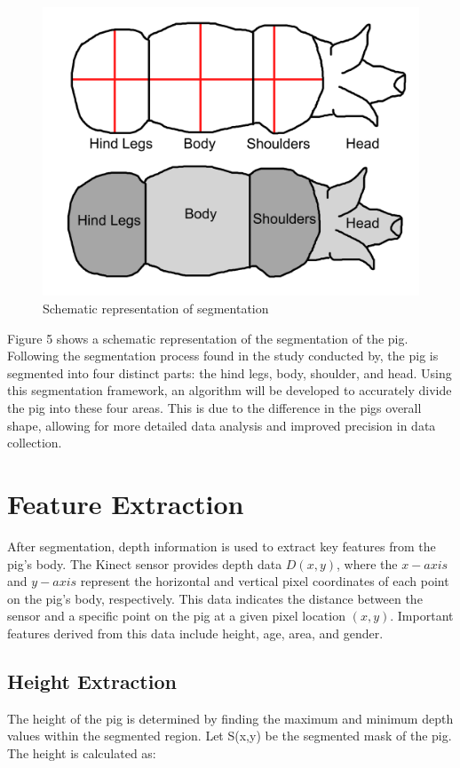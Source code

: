 {\begin{figure}[h]
	\centering
	\includegraphics[height=0.4\textheight]{figures/Untitled-1 (1)}
	\caption{Schematic representation of segmentation}
	\label{fig: Schematic representation of segmentation}
\end{figure}

Figure 5 shows a schematic representation of the segmentation of the pig. Following the segmentation process found in the study conducted by, the pig is segmented into four distinct parts: the hind legs, body, shoulder, and head. Using this segmentation framework, an algorithm will be developed to accurately divide the pig into these four areas. This is due to the difference in the pigs overall shape, allowing for more detailed data analysis and improved precision in data collection.

\section{Feature Extraction}
After segmentation, depth information is used to extract key features from the pig’s body. The Kinect sensor provides depth data $D(x,y)$, where the $x-axis$ and $y-axis$ represent the horizontal and vertical pixel coordinates of each point on the pig’s body, respectively. This data indicates the distance between the sensor and a specific point on the pig at a given pixel location $(x,y)$. Important features derived from this data include height, age, area, and gender.

\subsection{Height Extraction}
The height of the pig is determined by finding the maximum and minimum depth values within the segmented region. Let S(x,y) be the segmented mask of the pig. The height is calculated as:

}

